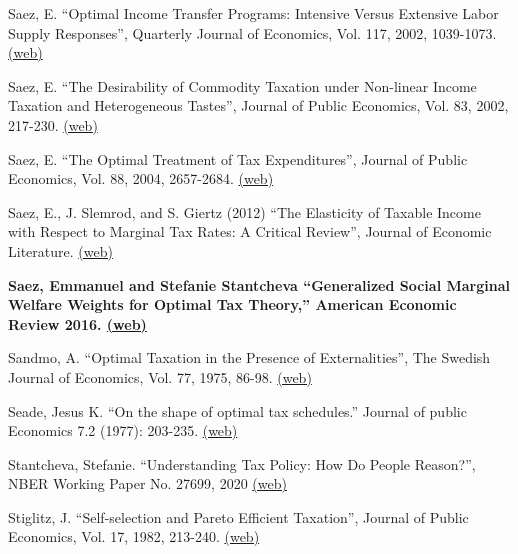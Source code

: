 \documentclass[landscape]{slides}
\begin{document}
\begin{slide}
{Saez, E. ``Optimal Income Transfer Programs: Intensive Versus Extensive Labor Supply Responses'', Quarterly Journal of Economics, Vol. 117, 2002, 1039-1073.  \href{http://links.jstor.org/stable/pdfplus/4132495.pdf} {(web)} 

Saez, E. ``The Desirability of Commodity Taxation under Non-linear Income Taxation and Heterogeneous Tastes'', Journal of Public Economics, Vol. 83, 2002, 217-230. \href{http://elsa.berkeley.edu/~saez/course/Saez_JPubE(2002).pdf} {(web)}

Saez, E. ``The Optimal Treatment of Tax Expenditures'', Journal of Public Economics, Vol. 88, 2004, 2657-2684. \href{http://elsa.berkeley.edu/~saez/course/Saez_JPubE(2004).pdf} {(web)}

Saez, E., J. Slemrod, and S. Giertz (2012) ``The Elasticity of Taxable Income with Respect to Marginal Tax Rates: A Critical Review'', Journal of Economic Literature. \href{http://elsa.berkeley.edu/~saez/course/Saez et al(2010).pdf} {(web)} 

\textbf{Saez, Emmanuel and Stefanie Stantcheva ``Generalized Social Marginal Welfare Weights for Optimal Tax Theory,'' American Economic Review 2016. \href{http://eml.berkeley.edu/~saez/saez-stantchevaAER16.pdf} {(web)} }

Sandmo, A. ``Optimal Taxation in the Presence of Externalities'', The Swedish Journal of Economics, Vol. 77, 1975, 86-98. \href{http://www.jstor.org/stable/pdfplus/3439329.pdf} {(web)}

Seade, Jesus K. ``On the shape of optimal tax schedules.'' Journal of public Economics 7.2 (1977): 203-235.
\href{http://elsa.berkeley.edu/~saez/course/seadeJpubE77zerotopresults.pdf} {(web)} 

Stantcheva, Stefanie. ``Understanding Tax Policy: How Do People Reason?'', NBER Working Paper No. 27699, 2020
\href{http://www.nber.org/papers/w27699.pdf} {(web)} 

Stiglitz, J. ``Self-selection and Pareto Efficient Taxation'', Journal of Public Economics, Vol. 17, 1982, 213-240. \href{http://elsa.berkeley.edu/~saez/course/Stiglitz_JPubE(1982).pdf} {(web)}



}
\end{slide}
\end{document}
